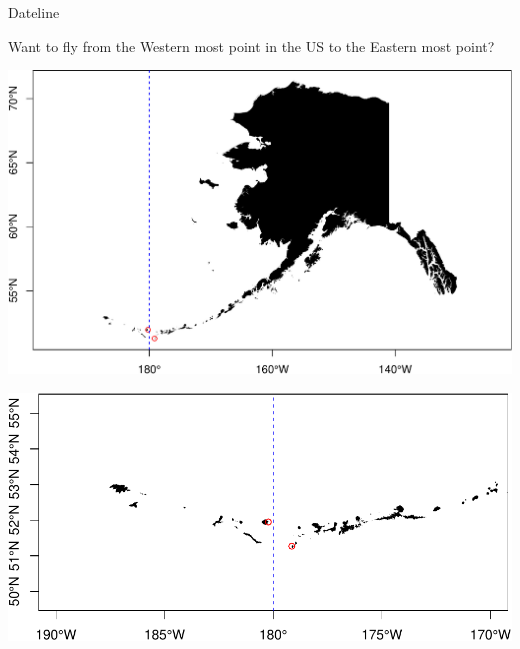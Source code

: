 \documentclass[11pt,ignorenonframetext,]{beamer}
\begin{document}
\begin{frame}{Dateline}
\protect\hypertarget{dateline}{}

Want to fly from the Western most point in the US to the Eastern most
point?

\begin{center}\includegraphics[width=\textwidth]{Lec15_files/figure-beamer/unnamed-chunk-11-1} \end{center}

\end{frame}

\begin{frame}{}
\protect\hypertarget{section}{}

\begin{center}\includegraphics[width=\textwidth]{Lec15_files/figure-beamer/unnamed-chunk-12-1} \end{center}

\end{frame}
\end{document}
